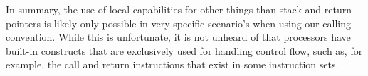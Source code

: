 \documentclass{llncs}
\begin{document}
In summary, the use of local capabilities for other things than stack and return
pointers is likely only possible in very specific scenario's when using our
calling convention. While this is unfortunate, it is not unheard of that
processors have built-in constructs that are exclusively used for handling
control flow, such as, for example, the call and return instructions that exist
in some instruction sets.
\end{document}

